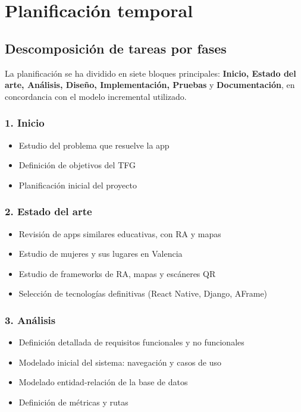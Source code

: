 \section{Planificaci\'on temporal}
\subsection{Descomposición de tareas por fases}
La planificación se ha dividido en siete bloques principales: \textbf{Inicio, Estado del arte, An\'alisis, Dise\~no, Implementaci\'on, Pruebas} y \textbf{Documentaci\'on}, en concordancia con el modelo incremental utilizado.

\subsubsection*{1. Inicio}
\begin{itemize}
  \item Estudio del problema que resuelve la app
  \item Definición de objetivos del TFG
  \item Planificación inicial del proyecto
\end{itemize}

\subsubsection*{2. Estado del arte}
\begin{itemize}
  \item Revisión de apps similares educativas, con RA y mapas
  \item Estudio de mujeres y sus lugares en Valencia
  \item Estudio de frameworks de RA, mapas y escáneres QR
  \item Selección de tecnologías definitivas (React Native, Django, AFrame)
\end{itemize}

\subsubsection*{3. Análisis}
\begin{itemize}
  \item Definición detallada de requisitos funcionales y no funcionales
  \item Modelado inicial del sistema: navegación y casos de uso
  \item Modelado entidad-relación de la base de datos
  \item Definición de métricas y rutas
\end{itemize}

